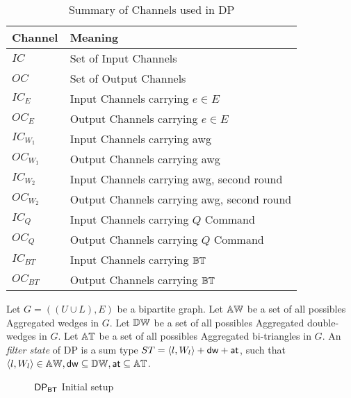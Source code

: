 \begin{table}[ht]
\centering
\begin{tabular}{|p{0.2\linewidth}|p{0.8\linewidth}|} \hline
\textbf{Channel} & \textbf{Meaning}\\ \hline
$IC$ & Set of Input Channels \\ \hline
$OC$ & Set of Output Channels \\ \hline
$IC_E$ & Input Channels carrying $e \in E$ \\ \hline
$OC_E$ & Output Channels carrying $e \in E$ \\ \hline
$IC_{W_1}$ & Input Channels carrying \acrshort{awg} \\ \hline
$OC_{W_1}$ & Output Channels carrying \acrshort{awg} \\ \hline
$IC_{W_2}$ & Input Channels carrying \acrshort{awg}, second round \\ \hline
$OC_{W_2}$ & Output Channels carrying \acrshort{awg}, second round \\ \hline
$IC_Q$ & Input Channels carrying $Q$ Command \\ \hline
$OC_Q$ & Output Channels carrying $Q$ Command \\ \hline
$IC_{BT}$ & Input Channels carrying $\mathbb{BT}$ \\ \hline
$OC_{BT}$ & Output Channels carrying $\mathbb{BT}$ \\ \hline
\end{tabular}
\caption{Summary of Channels used in DP}
\label{table:channels}
\end{table}

\begin{definition}
Let $G=((U\cup L),E)$ be a bipartite graph. 
Let $\mathbb{AW}$ be a set of all possibles Aggregated wedges in $G$.
Let $\mathbb{DW}$ be a set of all possibles Aggregated double-wedges in $G$.
Let $\mathbb{AT}$ be a set of all possibles Aggregated bi-triangles in $G$.
An \textit{filter state} of DP is a sum type $ST = \left\langle l, W_l \right\rangle + \mathsf{dw} + \mathsf{at}$, such that $\left\langle l, W_l \right\rangle \in \mathbb{AW}, \mathsf{dw} \subseteq \mathbb{DW}, \mathsf{at} \subseteq \mathbb{AT}$.
\end{definition}
 
\begin{figure}[h]
\centering  
{}
\caption{$\mathsf{DP_{BT}}$ Initial setup}
\label{fig:btDP}
\end{figure}

